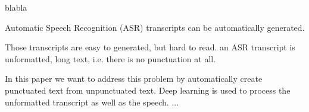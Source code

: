 
blabla

Automatic Speech Recognition (ASR) transcripts can be automatically generated.

Those transcripts are easy to generated, but hard to read.
an ASR transcript is unformatted, long text, i.e. there is no punctuation at all.

In this paper we want to address this problem by automatically create punctuated text from unpunctuated text.
Deep learning is used to process the unformatted transcript as well as the speech.
...



